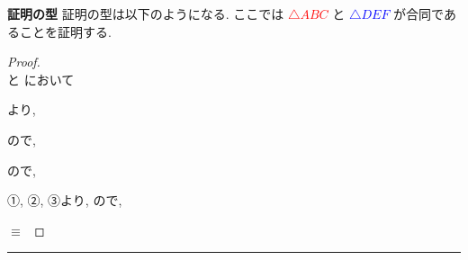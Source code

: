 \begin{theorembox}{\textbf{証明の型}}
    \label{thm:証明の型}
    証明の型は以下のようになる. ここでは \textcolor{red}{\underline{$\triangle ABC$}} と \textcolor{blue}{\underline{$\triangle DEF$}} が合同であることを証明する.
\vspace{-1.5em}
    \begin{proof}
        \setlength{\baselineskip}{1.5\baselineskip}
        \mbox{}\\
        \textcolor{red}{ } と \textcolor{blue}{ } において

        \vspace{0.3em}
        \textcolor{black}{} より,

        \vspace{0.3em}

        \vspace{0.3em}
        \textcolor{black}{} ので,

        \vspace{0.3em}

        \vspace{0.3em}
        \textcolor{black}{} ので,

        \vspace{0.3em}

        \vspace{0.3em}
        ①, ②, ③より, \textcolor{black}{\fitblankbf[合同条件]{} } ので,

        \vspace{0.3em}
        \textcolor{red}{ } $\equiv$ \textcolor{blue}{ }
    \end{proof}
\end{theorembox}
\vspace{-2em}
\vfill
\noindent\rule{\textwidth}{0.4pt}

